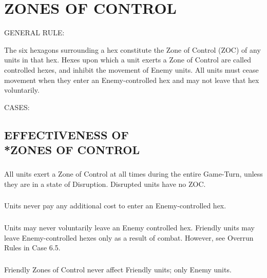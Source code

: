 \section{ZONES OF CONTROL}

GENERAL RULE:

\begin{figure}
  \vspace{-1.2\baselineskip}
  \centering
  
  \vspace{-0.8\baselineskip}
\end{figure}
The six hexagons surrounding a hex constitute the Zone of Control (ZOC) of any units in that hex. Hexes upon which a unit exerts a Zone of Control are called controlled hexes, and inhibit the movement of Enemy units. All units must cease movement when they enter an Enemy-controlled hex and may not leave that hex voluntarily.

CASES:

\subsection{EFFECTIVENESS OF\\*ZONES OF CONTROL}

\subsubsection{} All units exert a Zone of Control at all times during the entire Game-Turn, unless they are in a state of Disruption. Disrupted units have no ZOC.

\subsubsection{} Units never pay any additional cost to enter an Enemy-controlled hex.

\subsubsection{} Units may never voluntarily leave an Enemy controlled hex. Friendly units may leave Enemy-controlled hexes only as a result of combat. However, see Overrun Rules in Case 6.5.

\subsubsection{} Friendly Zones of Control never affect Friendly units; only Enemy units.

